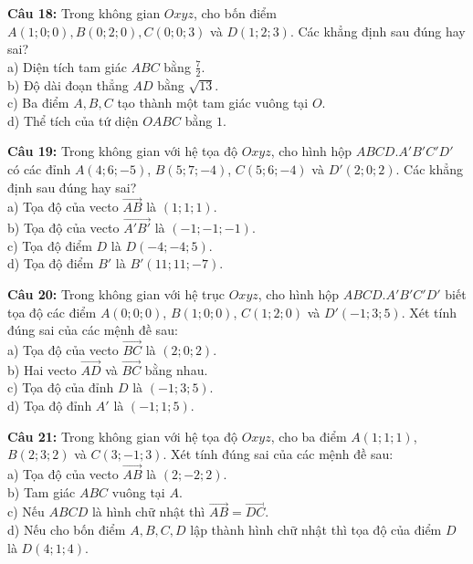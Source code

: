\documentclass[12pt]{article}
\begin{document}
	\vspace{4mm}
	\noindent \textbf{Câu 18:} Trong không gian $Oxyz$, cho bốn điểm $A(1; 0; 0), B(0; 2; 0), C(0; 0; 3)$ và $D(1; 2; 3)$. Các khẳng định sau đúng hay sai? \\
	\noindent a) Diện tích tam giác $ABC$ bằng $\frac{7}{2}$. \\
	\noindent b) Độ dài đoạn thẳng $AD$ bằng $\sqrt{13}$. \\
	\noindent c) Ba điểm $A, B, C$ tạo thành một tam giác vuông tại $O$. \\
	\noindent d) Thể tích của tứ diện $OABC$ bằng $1$.
	
	\noindent \textbf{Câu 19:} Trong không gian với hệ tọa độ $Oxyz$, cho hình hộp $ABCD.A'B'C'D'$ có các đỉnh $A(4; 6; -5)$, $B(5; 7; -4)$, $C(5; 6; -4)$ và $D'(2; 0; 2)$. Các khẳng định sau đúng hay sai? \\
	\noindent a) Tọa độ của vecto $\vec{AB}$ là $(1; 1; 1)$. \\
	\noindent b) Tọa độ của vecto $\vec{A'B'}$ là $(-1; -1; -1)$. \\
	\noindent c) Tọa độ điểm $D$ là $D(-4; -4; 5)$. \\
	\noindent d) Tọa độ điểm $B'$ là $B'(11; 11; -7)$.
	
	\vspace{4mm}
	\noindent \textbf{Câu 20:} Trong không gian với hệ trục $Oxyz$, cho hình hộp $ABCD.A'B'C'D'$ biết tọa độ các điểm $A(0; 0; 0)$, $B(1; 0; 0)$, $C(1; 2; 0)$ và $D'(-1; 3; 5)$. Xét tính đúng sai của các mệnh đề sau: \\
	\noindent a) Tọa độ của vecto $\vec{BC}$ là $(2; 0; 2)$. \\
	\noindent b) Hai vecto $\vec{AD}$ và $\vec{BC}$ bằng nhau. \\
	\noindent c) Tọa độ của đỉnh $D$ là $(-1; 3; 5)$. \\
	\noindent d) Tọa độ đỉnh $A'$ là $(-1; 1; 5)$.
	
	\vspace{4mm}
	\noindent \textbf{Câu 21:} Trong không gian với hệ tọa độ $Oxyz$, cho ba điểm $A(1; 1; 1)$, $B(2; 3; 2)$ và $C(3; -1; 3)$. Xét tính đúng sai của các mệnh đề sau: \\
	\noindent a) Tọa độ của vecto $\vec{AB}$ là $(2; -2; 2)$. \\
	\noindent b) Tam giác $ABC$ vuông tại $A$. \\
	\noindent c) Nếu $ABCD$ là hình chữ nhật thì $\vec{AB} = \vec{DC}$. \\
	\noindent d) Nếu cho bốn điểm $A, B, C, D$ lập thành hình chữ nhật thì tọa độ của điểm $D$ là $D(4; 1; 4)$.
	
\end{document}

